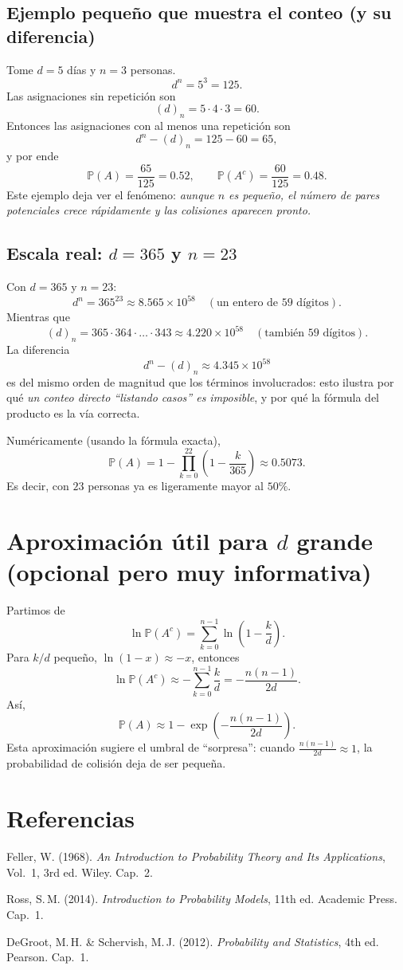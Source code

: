 \documentclass[11pt, letterpaper]{article}
\begin{document}
\subsection{Ejemplo pequeño que muestra el conteo (y su diferencia)}
Tome $d=5$ días y $n=3$ personas.
\[
d^n = 5^3 = 125.
\]
Las asignaciones sin repetición son
\[
(d)_n = 5\cdot 4\cdot 3 = 60.
\]
Entonces las asignaciones con al menos una repetición son
\[
d^n-(d)_n = 125-60 = 65,
\]
y por ende
\[
\mathbb{P}(A)=\frac{65}{125}=0.52,
\qquad
\mathbb{P}(A^c)=\frac{60}{125}=0.48.
\]
Este ejemplo deja ver el fenómeno: \emph{aunque $n$ es pequeño, el número de pares potenciales crece rápidamente y las colisiones aparecen pronto.}

\subsection{Escala real: $d=365$ y $n=23$}
Con $d=365$ y $n=23$:
\[
d^n = 365^{23} \approx 8.565\times 10^{58}
\quad (\text{un entero de }59\text{ dígitos}).
\]
Mientras que
\[
(d)_n = 365\cdot 364\cdot \ldots \cdot 343 \approx 4.220\times 10^{58}
\quad (\text{también }59\text{ dígitos}).
\]
La diferencia
\[
d^n-(d)_n \approx 4.345\times 10^{58}
\]
es del mismo orden de magnitud que los términos involucrados: esto ilustra por qué
\emph{un conteo directo ``listando casos'' es imposible}, y por qué la fórmula del producto es la vía correcta.

Numéricamente (usando la fórmula exacta),
\[
\mathbb{P}(A)=1-\prod_{k=0}^{22}\left(1-\frac{k}{365}\right)\approx 0.5073.
\]
Es decir, con $23$ personas ya es ligeramente mayor al $50\%$.

\section{Aproximación útil para $d$ grande (opcional pero muy informativa)}
Partimos de
\[
\ln\mathbb{P}(A^c)=\sum_{k=0}^{n-1}\ln\left(1-\frac{k}{d}\right).
\]
Para $k/d$ pequeño, $\ln(1-x)\approx -x$, entonces
\[
\ln\mathbb{P}(A^c)\approx -\sum_{k=0}^{n-1}\frac{k}{d}
= -\frac{n(n-1)}{2d}.
\]
Así,
\[
\boxed{
\mathbb{P}(A)\approx 1-\exp\!\left(-\frac{n(n-1)}{2d}\right).
}
\]
Esta aproximación sugiere el umbral de ``sorpresa'': cuando $\frac{n(n-1)}{2d}\approx 1$,
la probabilidad de colisión deja de ser pequeña.

\section*{Referencias}
\begin{enumerate}[label={[\arabic*]}]
    \item Feller, W. (1968). \textit{An Introduction to Probability Theory and Its Applications}, Vol.~1, 3rd ed. Wiley. Cap.~2.
    \item Ross, S.\,M. (2014). \textit{Introduction to Probability Models}, 11th ed. Academic Press. Cap.~1.
    \item DeGroot, M.\,H. \& Schervish, M.\,J. (2012). \textit{Probability and Statistics}, 4th ed. Pearson. Cap.~1.
\end{enumerate}
\end{document}

